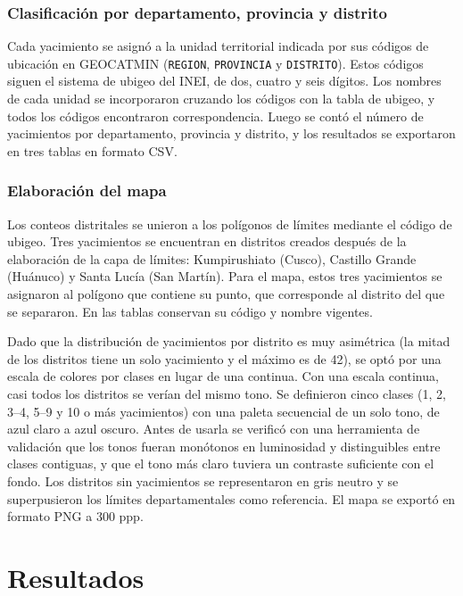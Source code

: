 \documentclass[man,12pt,a4paper,floatsintext,donotrepeattitle]{apa7}
\begin{document}
\subsubsection{Clasificación por departamento, provincia y distrito}

Cada yacimiento se asignó a la unidad territorial indicada por sus códigos de
ubicación en GEOCATMIN (\texttt{REGION}, \texttt{PROVINCIA} y
\texttt{DISTRITO}). Estos códigos siguen el sistema de ubigeo del INEI, de dos,
cuatro y seis dígitos. Los nombres de cada unidad se incorporaron cruzando los
códigos con la tabla de ubigeo, y todos los códigos encontraron correspondencia.
Luego se contó el número de yacimientos por departamento, provincia y distrito, y
los resultados se exportaron en tres tablas en formato CSV.

\subsubsection{Elaboración del mapa}

Los conteos distritales se unieron a los polígonos de límites mediante el código
de ubigeo. Tres yacimientos se encuentran en distritos creados después de la
elaboración de la capa de límites: Kumpirushiato (Cusco), Castillo Grande
(Huánuco) y Santa Lucía (San Martín). Para el mapa, estos tres yacimientos se
asignaron al polígono que contiene su punto, que corresponde al distrito del que
se separaron. En las tablas conservan su código y nombre vigentes.

Dado que la distribución de yacimientos por distrito es muy asimétrica (la mitad
de los distritos tiene un solo yacimiento y el máximo es de 42), se optó por una
escala de colores por clases en lugar de una continua. Con una escala continua,
casi todos los distritos se verían del mismo tono. Se definieron cinco clases (1,
2, 3--4, 5--9 y 10 o más yacimientos) con una paleta secuencial de un solo tono,
de azul claro a azul oscuro. Antes de usarla se verificó con una herramienta de
validación que los tonos fueran monótonos en luminosidad y distinguibles entre
clases contiguas, y que el tono más claro tuviera un contraste suficiente con el
fondo. Los distritos sin yacimientos se representaron en gris neutro y se
superpusieron los límites departamentales como referencia. El mapa se exportó en
formato PNG a 300 ppp.

\section{Resultados}
\end{document}
